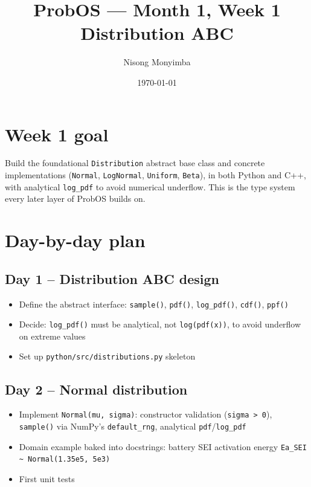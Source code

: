 \documentclass[11pt]{article}
\title{ProbOS --- Month 1, Week 1\\Distribution ABC}
\author{Nisong Monyimba}
\date{\today}
\begin{document}
\maketitle

\section*{Week 1 goal}
Build the foundational \texttt{Distribution} abstract base class and
concrete implementations (\texttt{Normal}, \texttt{LogNormal},
\texttt{Uniform}, \texttt{Beta}), in both Python and C++, with
analytical \texttt{log\_pdf} to avoid numerical underflow. This is the
type system every later layer of ProbOS builds on.

\section*{Day-by-day plan}

\subsection*{Day 1 -- Distribution ABC design}
\begin{itemize}[leftmargin=*]
  \item Define the abstract interface: \texttt{sample()}, \texttt{pdf()},
    \texttt{log\_pdf()}, \texttt{cdf()}, \texttt{ppf()}
  \item Decide: \texttt{log\_pdf()} must be analytical, not
    \texttt{log(pdf(x))}, to avoid underflow on extreme values
  \item Set up \texttt{python/src/distributions.py} skeleton
\end{itemize}

\subsection*{Day 2 -- Normal distribution}
\begin{itemize}[leftmargin=*]
  \item Implement \texttt{Normal(mu, sigma)}: constructor validation
    (\texttt{sigma > 0}), \texttt{sample()} via NumPy's
    \texttt{default\_rng}, analytical \texttt{pdf}/\texttt{log\_pdf}
  \item Domain example baked into docstrings: battery SEI activation
    energy \texttt{Ea\_SEI \textasciitilde{} Normal(1.35e5, 5e3)}
  \item First unit tests
\end{itemize}
\end{document}
